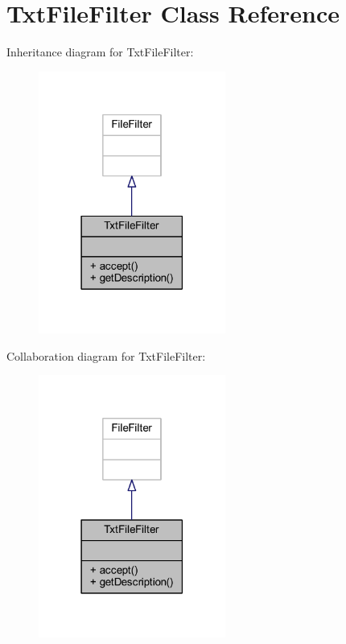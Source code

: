 \hypertarget{class_txt_file_filter}{\section{Txt\-File\-Filter Class Reference}
\label{class_txt_file_filter}
}


Inheritance diagram for Txt\-File\-Filter\-:
\nopagebreak
\begin{figure}[H]
\begin{center}
\leavevmode
\includegraphics[width=174pt]{class_txt_file_filter__inherit__graph}
\end{center}
\end{figure}


Collaboration diagram for Txt\-File\-Filter\-:
\nopagebreak
\begin{figure}[H]
\begin{center}
\leavevmode
\includegraphics[width=174pt]{class_txt_file_filter__coll__graph}
\end{center}
\end{figure}
